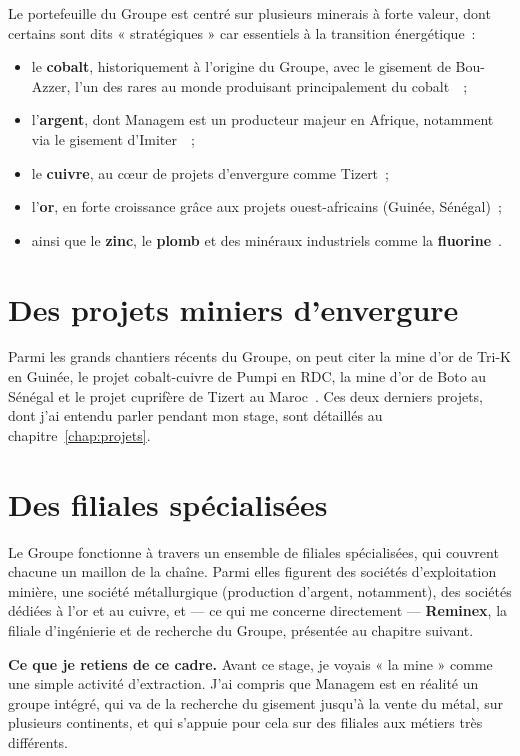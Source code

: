 Le portefeuille du Groupe est centré sur plusieurs minerais à forte valeur, dont certains sont dits « stratégiques » car essentiels à la transition énergétique~:

\begin{itemize}
\item le \textbf{cobalt}, historiquement à l'origine du Groupe, avec le gisement de Bou-Azzer, l'un des rares au monde produisant principalement du cobalt~\cite{ecofin_managem}~;
\item l'\textbf{argent}, dont Managem est un producteur majeur en Afrique, notamment via le gisement d'Imiter~\cite{ecofin_managem}~;
\item le \textbf{cuivre}, au cœur de projets d'envergure comme Tizert~;
\item l'\textbf{or}, en forte croissance grâce aux projets ouest-africains (Guinée, Sénégal)~;
\item ainsi que le \textbf{zinc}, le \textbf{plomb} et des minéraux industriels comme la \textbf{fluorine}~\cite{morocco_minerals}.
\end{itemize}

\section{Des projets miniers d'envergure}

Parmi les grands chantiers récents du Groupe, on peut citer la mine d'or de Tri-K en Guinée, le projet cobalt-cuivre de Pumpi en RDC, la mine d'or de Boto au Sénégal et le projet cuprifère de Tizert au Maroc~\cite{ecofin_managem}. Ces deux derniers projets, dont j'ai entendu parler pendant mon stage, sont détaillés au chapitre~\ref{chap:projets}.

\section{Des filiales spécialisées}

Le Groupe fonctionne à travers un ensemble de filiales spécialisées, qui couvrent chacune un maillon de la chaîne. Parmi elles figurent des sociétés d'exploitation minière, une société métallurgique (production d'argent, notamment), des sociétés dédiées à l'or et au cuivre, et --- ce qui me concerne directement --- \textbf{Reminex}, la filiale d'ingénierie et de recherche du Groupe, présentée au chapitre suivant.

\begin{presente}
\textbf{Ce que je retiens de ce cadre.} Avant ce stage, je voyais « la mine » comme une simple activité d'extraction. J'ai compris que Managem est en réalité un groupe intégré, qui va de la recherche du gisement jusqu'à la vente du métal, sur plusieurs continents, et qui s'appuie pour cela sur des filiales aux métiers très différents.
\end{presente}
